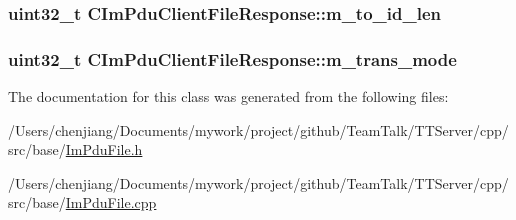 \subsubsection[{m\+\_\+to\+\_\+id\+\_\+len}]{\setlength{\rightskip}{0pt plus 5cm}uint32\+\_\+t C\+Im\+Pdu\+Client\+File\+Response\+::m\+\_\+to\+\_\+id\+\_\+len\hspace{0.3cm}{\ttfamily [private]}}\label{class_c_im_pdu_client_file_response_ad1de68e049e316401d00a5436f41e200}
\hypertarget{class_c_im_pdu_client_file_response_abced7aea7c136b70fbd3e4c431b1a518}{}
\subsubsection[{m\+\_\+trans\+\_\+mode}]{\setlength{\rightskip}{0pt plus 5cm}uint32\+\_\+t C\+Im\+Pdu\+Client\+File\+Response\+::m\+\_\+trans\+\_\+mode\hspace{0.3cm}{\ttfamily [private]}}\label{class_c_im_pdu_client_file_response_abced7aea7c136b70fbd3e4c431b1a518}


The documentation for this class was generated from the following files\+:\begin{DoxyCompactItemize}
\item 
/\+Users/chenjiang/\+Documents/mywork/project/github/\+Team\+Talk/\+T\+T\+Server/cpp/src/base/\hyperlink{_im_pdu_file_8h}{Im\+Pdu\+File.\+h}\item 
/\+Users/chenjiang/\+Documents/mywork/project/github/\+Team\+Talk/\+T\+T\+Server/cpp/src/base/\hyperlink{_im_pdu_file_8cpp}{Im\+Pdu\+File.\+cpp}\end{DoxyCompactItemize}
